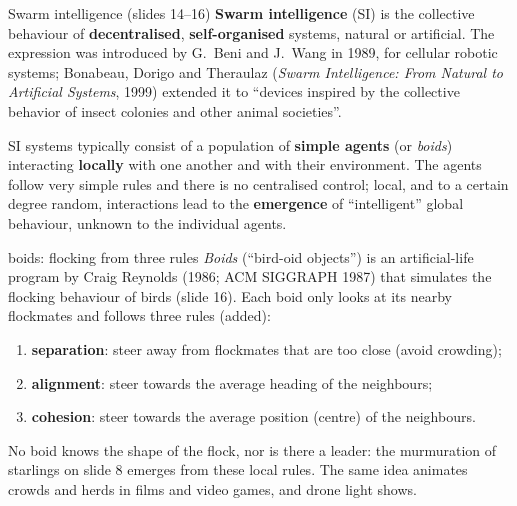\begin{nbdef}{Swarm intelligence (slides 14--16)}
\textbf{Swarm intelligence} (SI) is the collective behaviour of \textbf{decentralised},
\textbf{self-organised} systems, natural or artificial. The expression was introduced by
G.~Beni and J.~Wang in 1989, for cellular robotic systems; Bonabeau, Dorigo and Theraulaz
(\emph{Swarm Intelligence: From Natural to Artificial Systems}, 1999) extended it to
``devices inspired by the collective behavior of insect colonies and other animal
societies''.

SI systems typically consist of a population of \textbf{simple agents} (or \emph{boids})
interacting \textbf{locally} with one another and with their environment. The agents follow
very simple rules and there is no centralised control; local, and to a certain degree
random, interactions lead to the \textbf{emergence} of ``intelligent'' global behaviour,
unknown to the individual agents.
\end{nbdef}

\begin{nbexample}{boids: flocking from three rules}
\emph{Boids} (``bird-oid objects'') is an artificial-life program by Craig Reynolds (1986;
ACM SIGGRAPH 1987) that simulates the flocking behaviour of birds (slide 16). Each boid only
looks at its nearby flockmates and follows three rules (added):
\begin{center}
\end{center}
\begin{enumerate}[nosep]
  \item \textbf{separation}: steer away from flockmates that are too close (avoid crowding);
  \item \textbf{alignment}: steer towards the average heading of the neighbours;
  \item \textbf{cohesion}: steer towards the average position (centre) of the neighbours.
\end{enumerate}
No boid knows the shape of the flock, nor is there a leader: the murmuration of starlings on
slide 8 emerges from these local rules. The same idea animates crowds and herds in films and
video games, and drone light shows.
\end{nbexample}

